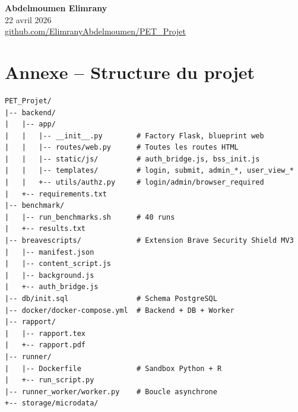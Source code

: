 \documentclass[12pt,a4paper]{article}
\begin{document}
\vspace{1.5cm}
\begin{flushright}
  \textbf{Abdelmoumen Elimrany}\\
  \textcolor{mygray}{22 avril 2026}\\
  \small\url{github.com/ElimranyAbdelmoumen/PET_Projet}
\end{flushright}

\newpage
\section*{Annexe -- Structure du projet}

\begin{lstlisting}
PET_Projet/
|-- backend/
|   |-- app/
|   |   |-- __init__.py        # Factory Flask, blueprint web
|   |   |-- routes/web.py      # Toutes les routes HTML
|   |   |-- static/js/         # auth_bridge.js, bss_init.js
|   |   |-- templates/         # login, submit, admin_*, user_view_*
|   |   +-- utils/authz.py     # login/admin/browser_required
|   +-- requirements.txt
|-- benchmark/
|   |-- run_benchmarks.sh      # 40 runs
|   +-- results.txt
|-- breavescripts/             # Extension Brave Security Shield MV3
|   |-- manifest.json
|   |-- content_script.js
|   |-- background.js
|   +-- auth_bridge.js
|-- db/init.sql                # Schema PostgreSQL
|-- docker/docker-compose.yml  # Backend + DB + Worker
|-- rapport/
|   |-- rapport.tex
|   +-- rapport.pdf
|-- runner/
|   |-- Dockerfile             # Sandbox Python + R
|   +-- run_script.py
|-- runner_worker/worker.py    # Boucle asynchrone
+-- storage/microdata/
\end{lstlisting}
\end{document}
